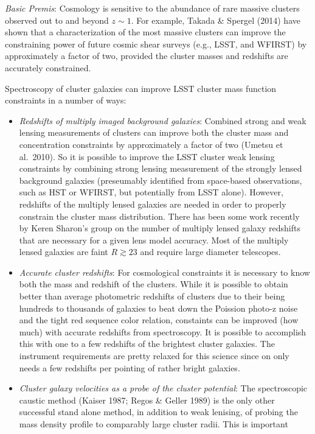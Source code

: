 {\it Basic Premis}: Cosmology is sensitive to the abundance of rare massive
clusters observed out to and beyond $z\sim 1$. For example, Takada \& Spergel
(2014) have shown that a characterization of the most massive clusters can
improve the constraining power of future cosmic shear surveys (e.g., LSST, and
WFIRST) by approximately a factor of two, provided the cluster masses and
redshifts are accurately constrained.

Spectroscopy of cluster galaxies can improve LSST cluster mass function
constraints in a number of ways:
\begin{itemize}
  \item {\it Redshifts of multiply imaged background galaxies}: Combined strong
  and weak lensing measurements of clusters can improve both the cluster mass
  and concentration constraints by approximately a factor of two (Umetsu et
  al.~2010). So it is possible to improve the LSST cluster weak lensing
  constraints by combining strong lensing measurement of the strongly lensed
  background galaxies (preseumably identified from space-based observations,
  such as HST or WFIRST, but potentially from LSST alone). However, redshifts of
  the multiply lensed galaxies are needed in order to properly constrain the
  cluster mass distribution. There has been some work recently by Keren Sharon's
  group on the number of multiply lensed galaxy redshifts that are necessary for
  a given lens model accuracy. Most of the multiply lensed galaxies are faint $R
  \gtrsim 23$ and require large diameter telescopes.
  \item {\it Accurate cluster redshifts}: For cosmological constraints it is
  necessary to know both the mass and redshift of the clusters. While it is
  possible to obtain better than average photometric redshifts of clusters due
  to their being hundreds to thousands of galaxies to beat down the Poission
  photo-z noise and the tight red sequence color relation, constaints can be
  improved (how much) with accurate redshifts from spectroscopy. It is possible
  to accomplish this with one to a few redshifts of the brightest cluster
  galaxies. The instrument requirements are pretty relaxed for this science
  since on only needs a few redshifts per pointing of rather bright galaxies.
  \item {\it Cluster galaxy velocities as a probe of the cluster potential}: The
  spectroscopic caustic method (Kaiser 1987; Regos \& Geller 1989) is the only
  other successful stand alone method, in addition to weak lenising, of probing
  the mass density profile to comparably large cluster radii. This is important

\end{itemize}
